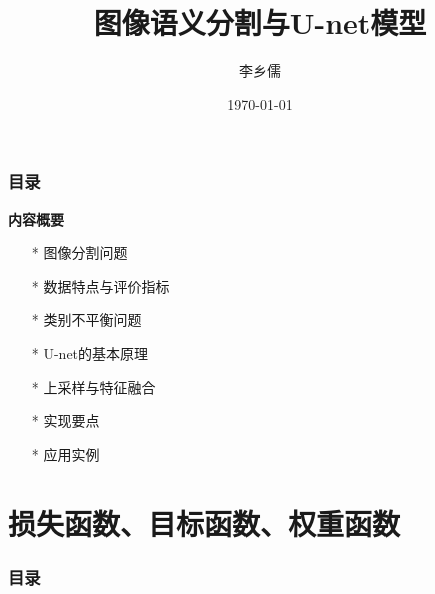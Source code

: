 \documentclass{beamer}%
\title[Unet and images segmentation]{图像语义分割与U-net模型}
\author{\large 李乡儒} %
\institute[SCNU]{\small
华南师范大学计算机学院
}
\date{\today}
\begin{document}
\graphicspath{{figures/}}

\begin{frame}%
	\titlepage
\end{frame}

\begin{frame}[allowframebreaks]
    \frametitle{\textsc{目录}} \vspace{-0.3cm}
    \begin{spacing}{0.0}
        \tableofcontents[hideallsubsections]
    \end{spacing}   %
\end{frame}

\begin{frame}[allowframebreaks]
    \vspace{-0.2cm}
    {\noindent\large\textbf{内容概要}}
    \vspace{0.4cm}
    \begin{itemize}
        \item[*] 图像分割问题
        \item[*] 数据特点与评价指标
        \item[*] 类别不平衡问题
        \item[*] U-net的基本原理
        \item[*] 上采样与特征融合
        \item[*] 实现要点
        \item[*] 应用实例
    \end{itemize}
\end{frame}








\section{损失函数、目标函数、权重函数}

\begin{frame}[allowframebreaks]
  \frametitle{\textsc{目录}} \vspace{-0.3cm}
    \begin{spacing}{0.0}
    \end{spacing}   %
\end{frame}
\end{document}
